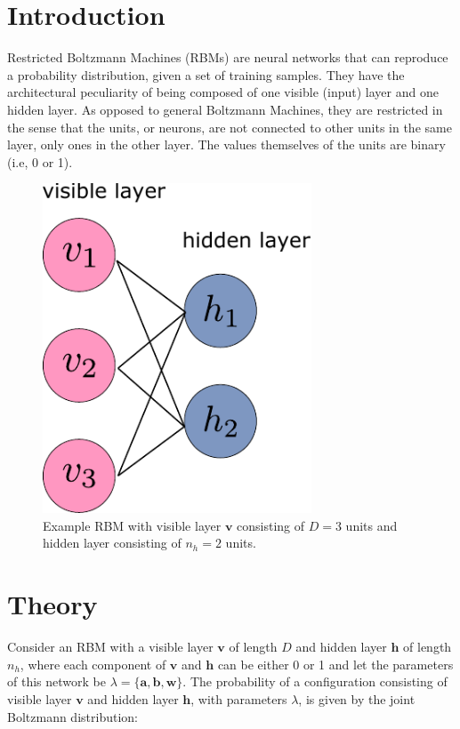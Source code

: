 \documentclass[12pt, two sided]{article}
\begin{document}


\section{Introduction}

Restricted Boltzmann Machines (RBMs) are neural networks that can reproduce a probability distribution, given a set of training samples. They have the architectural peculiarity of being composed of one visible (input) layer and one hidden layer. As opposed to general Boltzmann Machines, they are restricted in the sense that the units, or neurons, are not connected to other units in the same layer, only ones in the other layer. The values themselves of the units are binary (i.e, 0 or 1).

\begin{figure}[h!]
\includegraphics[width=8cm]{Figures/rbm.pdf}
\caption{Example RBM with visible layer $\mathbf{v}$ consisting of $D=3$ units and hidden layer consisting of $n_h=2$ units.}
\end{figure} 


\section{Theory}

Consider an RBM with a visible layer $\mathbf{v}$ of length $D$ and hidden layer $\mathbf{h}$ of length $n_h$, where each component of $\mathbf{v}$ and $\mathbf{h}$ can be either 0 or 1 and let the parameters of this network be $\lambda=\lbrace \mathbf{a,b,w} \rbrace$. The probability of a configuration consisting of visible layer $\mathbf{v}$ and hidden layer $\mathbf{h}$, with parameters $\lambda$, is given by the joint Boltzmann distribution:
\end{document}
